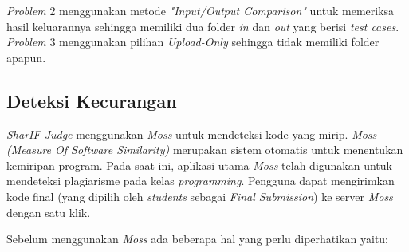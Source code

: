 \textit{Problem} 2 menggunakan metode \textit{"Input/Output Comparison"} untuk memeriksa hasil keluarannya sehingga memiliki dua folder \textit{in} dan \textit{out} yang berisi \textit{test cases}. \textit{Problem} 3 menggunakan pilihan \textit{Upload-Only} sehingga tidak memiliki folder apapun.

\subsection{Deteksi Kecurangan}
\label{subsec:deteksi_kecurangan}
\textit{SharIF Judge} menggunakan \textit{Moss} untuk mendeteksi kode yang mirip. \textit{Moss (Measure Of Software Similarity)} merupakan sistem otomatis untuk menentukan kemiripan program. Pada saat ini, aplikasi utama \textit{Moss} telah digunakan untuk mendeteksi plagiarisme pada kelas \textit{programming}. Pengguna dapat mengirimkan kode final (yang dipilih oleh \textit{students} sebagai \textit{Final Submission}) ke server \textit{Moss} dengan satu klik.

Sebelum menggunakan \textit{Moss} ada beberapa hal yang perlu diperhatikan yaitu:

